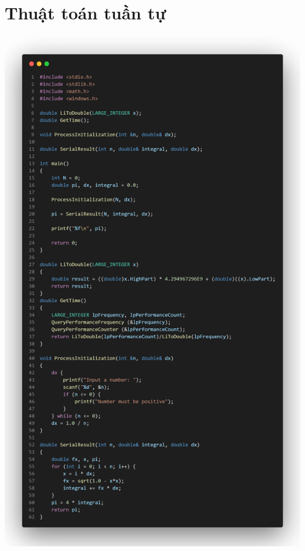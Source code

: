 \documentclass[12pt,a4paper]{report}
\begin{document}
\section{Thuật toán tuần tự}
\begin{center}
	\includegraphics[trim=0in 8in 0in 0in, clip, scale=0.2]{./Photos/PI/serial.PNG}
\clearpage

\end{center}
\end{document}
